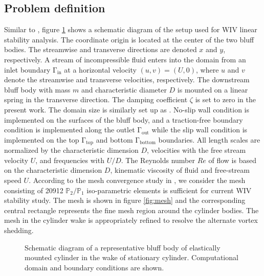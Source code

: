 \subsection{Problem definition}\label{sec:prob}
Similar to \cite{yao_jfm_1}, figure \ref{fig:schematic} shows a schematic diagram of the setup used for WIV linear stability analysis. 
The coordinate origin is located at the center of the two bluff bodies.
The streamwise and transverse directions are denoted $x$ and $y$, respectively.
%
A stream of incompressible fluid enters into the domain from an 
inlet boundary $\mathrm{\Gamma_{in}}$ at a horizontal velocity $(u,v)=(U,0)$, where $u$ and $v$ 
denote the streamwise and transverse velocities, respectively. 
The downstream bluff body with mass $m$ and characteristic diameter $D$ is mounted on a linear spring 
in the transverse direction. The damping coefficient $\zeta$ is set to zero in the present work.
%
The domain size is similarly set up as \cite{yao_jfm_1}. 
No-slip wall condition is implemented on the surfaces of the bluff body, and a traction-free
boundary condition is implemented along the outlet $\mathrm{\Gamma_{out}}$
while the slip wall condition is implemented on the top $\mathrm{\Gamma_{top}}$
and bottom $\mathrm{\Gamma_{bottom}}$ boundaries. 
%
All length scales are normalized by 
the characteristic dimension $D$, velocities
with the free stream velocity $U$, and frequencies with $U/D$.
%
The Reynolds number $Re$ of flow is based on the
characteristic dimension $D$, kinematic viscosity of fluid 
and free-stream speed $U$.
%
According to the mesh convergence study in \cite{yao_jfm_1}, we consider 
the mesh consisting of 20912 $\mathbb{P}_{2}/\mathbb{P}_{1}$ 
iso-parametric elements is sufficient for current WIV stability study. 
%
The mesh is shown in figure \ref{fig:mesh} and 
the corresponding central rectangle represents the fine mesh region around the cylinder bodies. 
The mesh in the cylinder wake is appropriately refined to resolve 
the alternate vortex shedding. 
\begin{figure}
	 \centering
     \caption{Schematic diagram of a representative bluff body of 
     elastically mounted cylinder in the wake of stationary cylinder. 
     Computational domain and boundary conditions are shown.}
\label{fig:schematic}
\end{figure}

